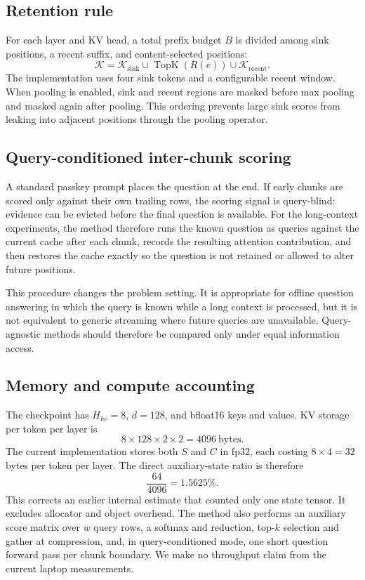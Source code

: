 \documentclass[10pt,twocolumn]{article}
\begin{document}
\subsection{Retention rule}
For each layer and KV head, a total prefix budget $B$ is divided among sink positions, a recent suffix, and content-selected positions:
\begin{equation}
\mathcal{K}=\mathcal{K}_{\mathrm{sink}}\cup
\operatorname{TopK}(R(e))\cup
\mathcal{K}_{\mathrm{recent}}.
\end{equation}
The implementation uses four sink tokens and a configurable recent window. When pooling is enabled, sink and recent regions are masked before max pooling and masked again after pooling. This ordering prevents large sink scores from leaking into adjacent positions through the pooling operator.

\subsection{Query-conditioned inter-chunk scoring}
A standard passkey prompt places the question at the end. If early chunks are scored only against their own trailing rows, the scoring signal is query-blind: evidence can be evicted before the final question is available. For the long-context experiments, the method therefore runs the known question as queries against the current cache after each chunk, records the resulting attention contribution, and then restores the cache exactly so the question is not retained or allowed to alter future positions.

This procedure changes the problem setting. It is appropriate for offline question answering in which the query is known while a long context is processed, but it is not equivalent to generic streaming where future queries are unavailable. Query-agnostic methods should therefore be compared only under equal information access.

\subsection{Memory and compute accounting}
The checkpoint has $H_{kv}=8$, $d=128$, and bfloat16 keys and values. KV storage per token per layer is
\begin{equation}
8\times128\times2\times2=4096\ \text{bytes}.
\end{equation}
The current implementation stores both $S$ and $C$ in fp32, each costing $8\times4=32$ bytes per token per layer. The direct auxiliary-state ratio is therefore
\begin{equation}
\frac{64}{4096}=1.5625\%.
\end{equation}
This corrects an earlier internal estimate that counted only one state tensor. It excludes allocator and object overhead. The method also performs an auxiliary score matrix over $w$ query rows, a softmax and reduction, top-$k$ selection and gather at compression, and, in query-conditioned mode, one short question forward pass per chunk boundary. We make no throughput claim from the current laptop measurements.
\end{document}
